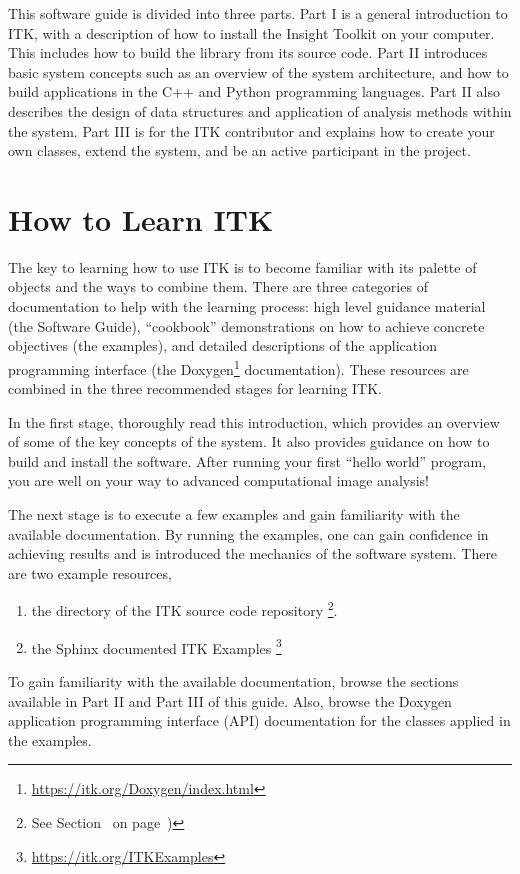 This software guide is divided into three parts. Part I is a general
introduction to ITK, with a description of how to install the Insight
Toolkit on your computer. This includes how to build the library from its
source code. Part II introduces basic system concepts such as an overview of
the system architecture, and how to build applications in the C++ and Python
programming languages. Part II also describes the design of data structures
and application of analysis methods within the system.  Part III is for the
ITK contributor and explains how to create your own classes, extend the
system, and be an active participant in the project.

\section{How to Learn ITK}
\label{sec:HowToLearnITK}

The key to learning how to use ITK is to become familiar with its palette of
objects and the ways to combine them. There are three categories of
documentation to help with the learning process: high level guidance material
(the Software Guide), ``cookbook'' demonstrations on how to achieve concrete
objectives (the examples), and detailed descriptions of the
application programming interface (the
Doxygen\footnote{\url{https://itk.org/Doxygen/index.html}} documentation). These
resources are combined in the three recommended stages for learning ITK.

In the first stage, thoroughly read this introduction, which provides an
overview of some of the key concepts of the system. It also provides guidance
on how to build and install the software. After running your first ``hello
world'' program, you are well on your way to advanced computational image
analysis!

The next stage is to execute a few examples and gain familiarity with the
available documentation. By running the examples, one can gain confidence
in achieving results and is introduced the mechanics of the software system.
There are two example resources,
\begin{enumerate}
  \item the  directory of the ITK source code repository
  \footnote{See Section~ on
  page~\pageref{sec:DownloadingITK})}.
  \item the Sphinx documented ITK Examples \footnote{\url{https://itk.org/ITKExamples}}
\end{enumerate}
To gain familiarity with the available documentation, browse the sections
available in Part II and Part III of this guide. Also, browse the Doxygen
application programming interface (API) documentation for the classes applied
in the examples.

